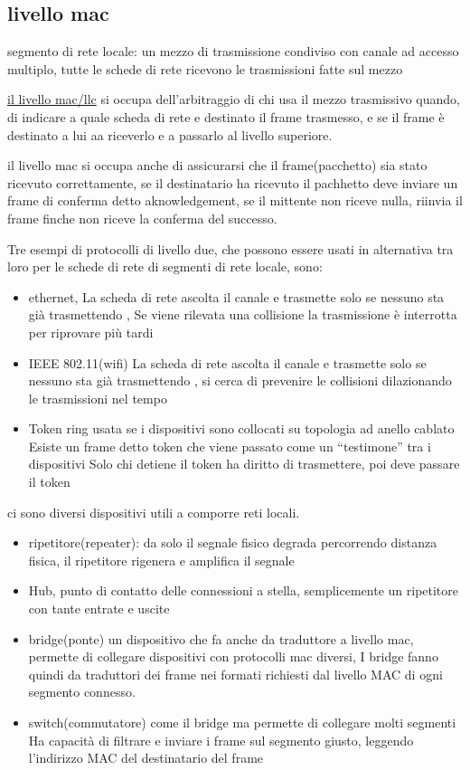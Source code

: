 \documentclass[12pt]{article}
\begin{document}
\subsection{livello mac}

segmento di rete locale: un mezzo di trasmissione condiviso con canale ad accesso multiplo, tutte le schede di rete ricevono le trasmissioni fatte sul mezzo

\underline{il livello mac/llc} si occupa dell'arbitraggio di chi usa il mezzo trasmissivo quando, di indicare a quale scheda di rete e destinato il frame trasmesso,
e se il frame è destinato a lui aa riceverlo e a passarlo al livello superiore.

il livello mac si occupa anche di assicurarsi che il frame(pacchetto) sia stato ricevuto correttamente, se il destinatario ha ricevuto il pachhetto deve inviare un frame di conferma detto aknowledgement,
se il mittente non riceve nulla, riinvia il frame finche non riceve la conferma del successo.


Tre esempi di protocolli di livello due, che possono essere usati in alternativa tra loro per le schede di rete di
segmenti di rete locale, sono:
\begin{itemize}
\item ethernet, La scheda di rete ascolta il canale e trasmette solo se nessuno sta già trasmettendo
, Se viene rilevata una collisione la trasmissione è interrotta per riprovare più tardi
\item IEEE 802.11(wifi) La scheda di rete ascolta il canale e trasmette solo se nessuno sta già trasmettendo
, si cerca di prevenire le collisioni dilazionando le trasmissioni nel tempo
\item Token ring
usata se i dispositivi sono collocati su topologia ad anello cablato  Esiste un frame detto token che viene passato come un “testimone” tra i dispositivi
 Solo chi detiene il token ha diritto di trasmettere, poi deve passare il token
\end{itemize}

ci sono diversi dispositivi utili a comporre reti locali.
\begin{itemize}
\item ripetitore(repeater): da solo il segnale fisico degrada percorrendo distanza fisica, il ripetitore rigenera e amplifica il segnale
\item Hub, punto di contatto delle connessioni a stella, semplicemente un ripetitore con tante entrate e uscite
\item bridge(ponte)  un dispositivo che fa anche da traduttore a livello mac, permette di collegare dispositivi con protocolli mac diversi, I bridge fanno quindi da traduttori dei frame nei formati richiesti dal livello MAC di ogni segmento connesso.
\item switch(commutatore) come il bridge ma permette di collegare molti segmenti Ha capacità di filtrare e inviare i frame sul segmento giusto, leggendo l’indirizzo MAC del
destinatario del frame
\end{itemize}
\end{document}
